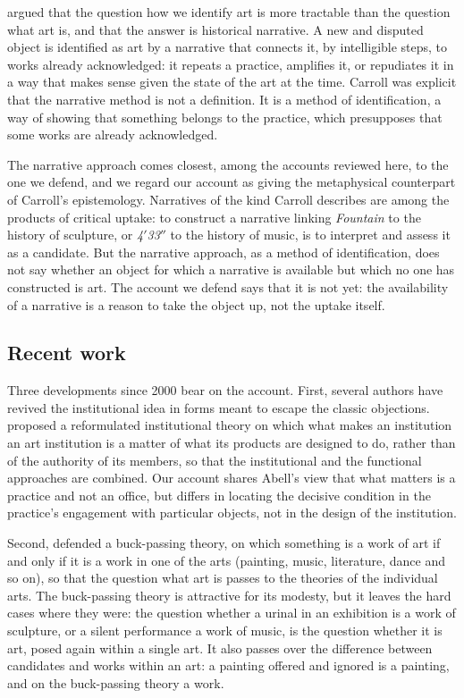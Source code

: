 \documentclass{situationist-preprint}
\begin{document}
\citet{Carroll1993,Carroll1999} argued that the question how we identify art is more tractable than the question what art is, and that the answer is historical narrative. A new and disputed object is identified as art by a narrative that connects it, by intelligible steps, to works already acknowledged: it repeats a practice, amplifies it, or repudiates it in a way that makes sense given the state of the art at the time. Carroll was explicit that the narrative method is not a definition. It is a method of identification, a way of showing that something belongs to the practice, which presupposes that some works are already acknowledged.

The narrative approach comes closest, among the accounts reviewed here, to the one we defend, and we regard our account as giving the metaphysical counterpart of Carroll's epistemology. Narratives of the kind Carroll describes are among the products of critical uptake: to construct a narrative linking \emph{Fountain} to the history of sculpture, or \emph{4$'$33$''$} to the history of music, is to interpret and assess it as a candidate. But the narrative approach, as a method of identification, does not say whether an object for which a narrative is available but which no one has constructed is art. The account we defend says that it is not yet: the availability of a narrative is a reason to take the object up, not the uptake itself.

\subsection{Recent work}

Three developments since 2000 bear on the account. First, several authors have revived the institutional idea in forms meant to escape the classic objections. \citet{Abell2012} proposed a reformulated institutional theory on which what makes an institution an art institution is a matter of what its products are designed to do, rather than of the authority of its members, so that the institutional and the functional approaches are combined. Our account shares Abell's view that what matters is a practice and not an office, but differs in locating the decisive condition in the practice's engagement with particular objects, not in the design of the institution.

Second, \citet{Lopes2014} defended a buck-passing theory, on which something is a work of art if and only if it is a work in one of the arts (painting, music, literature, dance and so on), so that the question what art is passes to the theories of the individual arts. The buck-passing theory is attractive for its modesty, but it leaves the hard cases where they were: the question whether a urinal in an exhibition is a work of sculpture, or a silent performance a work of music, is the question whether it is art, posed again within a single art. It also passes over the difference between candidates and works within an art: a painting offered and ignored is a painting, and on the buck-passing theory a work.
\end{document}
